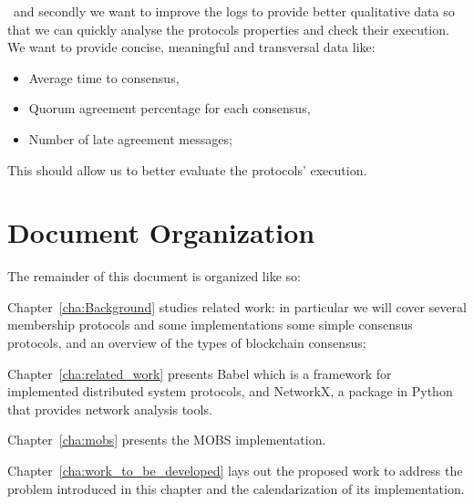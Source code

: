 \noindent~and secondly we want to improve the logs to provide better qualitative data so that we can quickly analyse the
protocols properties and check their execution. We want to provide concise, meaningful and transversal data like:
\begin{itemize}
  \item Average time to consensus,
  \item Quorum agreement percentage for each consensus,
  \item Number of late agreement messages;
\end{itemize}
This should allow us to better evaluate the protocols' execution.

\section{Document Organization}\label{sub:document_organization}

The remainder of this document is organized like so:

Chapter~\ref{cha:Background} studies related work: in particular we will cover several membership protocols and some implementations
some simple consensus protocols, and an overview of the types of blockchain consensus;


Chapter~\ref{cha:related_work} presents Babel which is a framework for implemented distributed system protocols, and NetworkX,
a package in Python that provides network analysis tools.

Chapter~\ref{cha:mobs} presents the MOBS implementation.

Chapter~\ref{cha:work_to_be_developed} lays out the proposed work to address the problem
introduced in this chapter and the calendarization of its implementation.